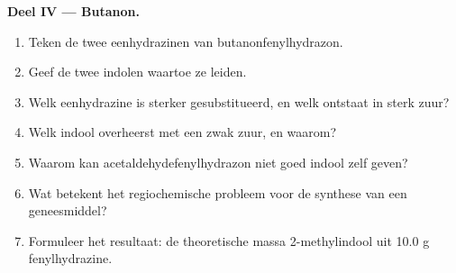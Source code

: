 \begin{problem}
\medskip\noindent\textbf{Deel IV --- Butanon.}
\begin{enumerate}[resume]
  \item Teken de twee eenhydrazinen van butanonfenylhydrazon.
  \item Geef de twee indolen waartoe ze leiden.
  \item Welk eenhydrazine is sterker gesubstitueerd, en welk ontstaat in
        sterk zuur?
  \item Welk indool overheerst met een zwak zuur, en waarom?
  \item Waarom kan acetaldehydefenylhydrazon niet goed indool zelf geven?
  \item Wat betekent het regiochemische probleem voor de synthese van een
        geneesmiddel?
  \item Formuleer het resultaat: de theoretische massa 2-methylindool uit
        10.0 g fenylhydrazine.
\end{enumerate}
\end{problem}

